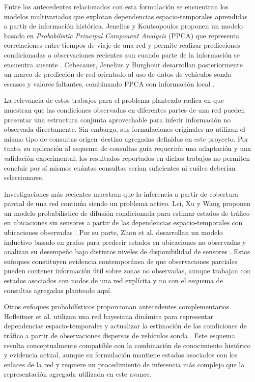 \documentclass[11pt]{article}
\begin{document}
Entre los antecedentes relacionados con esta formulación se encuentran los
modelos multivariados que explotan dependencias espacio-temporales aprendidas
a partir de información histórica. Jenelius y Koutsopoulos proponen un modelo
basado en \textit{Probabilistic Principal Component Analysis} (PPCA) que
representa correlaciones entre tiempos de viaje de una red y permite realizar
predicciones condicionadas a observaciones recientes aun cuando parte de la
información se encuentra ausente \citep{jenelius2018urban}. Cebecauer,
Jenelius y Burghout desarrollan posteriormente un marco de predicción de red
orientado al uso de datos de vehículos sonda escasos y valores faltantes,
combinando PPCA con información local
\citep{cebecauer2018integrated}.

La relevancia de estos trabajos para el problema planteado radica en que
muestran que las condiciones observadas en diferentes partes de una red pueden
presentar una estructura conjunta aprovechable para inferir información no
observada directamente. Sin embargo, sus formulaciones originales no utilizan
el mismo tipo de consultas origen--destino agregadas definidas en este
proyecto. Por tanto, su aplicación al esquema de consultas guía requeriría una
adaptación y una validación experimental; los resultados reportados en dichos
trabajos no permiten concluir por sí mismos cuántas consultas serían
suficientes ni cuáles deberían seleccionarse.

Investigaciones más recientes muestran que la inferencia a partir de cobertura
parcial de una red continúa siendo un problema activo. Lei, Xu y Wang proponen
un modelo probabilístico de difusión condicionada para estimar estados de
tráfico en ubicaciones sin sensores a partir de las dependencias
espacio-temporales con ubicaciones observadas \citep{lei2024conditional}.
Por su parte, Zhou et al. desarrollan un modelo inductivo basado en grafos para
predecir estados en ubicaciones no observadas y analizan su desempeño bajo
distintos niveles de disponibilidad de sensores \citep{zhou2025mogernn}.
Estos enfoques constituyen evidencia contemporánea de que observaciones
parciales pueden contener información útil sobre zonas no observadas, aunque
trabajan con estados asociados con nodos de una red explícita y no con el
esquema de consultas agregadas planteado aquí.

Otros enfoques probabilísticos proporcionan antecedentes complementarios.
Hofleitner et al. utilizan una red bayesiana dinámica para representar
dependencias espacio-temporales y actualizar la estimación de las condiciones
de tráfico a partir de observaciones dispersas de vehículos sonda
\citep{hofleitner2012learning}. Este esquema resulta conceptualmente
compatible con la combinación de conocimiento histórico y evidencia actual,
aunque su formulación mantiene estados asociados con los enlaces de la red y
requiere un procedimiento de inferencia más complejo que la representación
agregada utilizada en este avance.
\end{document}

